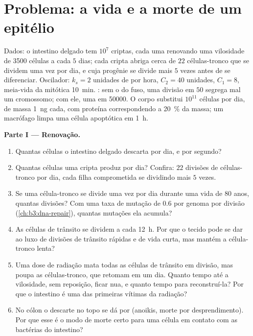 \section{Problema: a vida e a morte de um epitélio}

\begin{problem}
\label{pb:b3:cell-cycle-apoptosis:1}
Dados: o intestino delgado tem $10^{7}$ criptas, cada uma renovando uma
vilosidade de \num{3500} células a cada $5$ dias; cada cripta abriga
cerca de $22$ células-tronco que se dividem uma vez por dia, e cuja
progênie se divide mais $5$ vezes antes de se diferenciar. Oscilador:
$k_{s} = 2$ unidades de  por hora, $C_{2} = 40$ unidades,
$C_{1} = 8$, meia-vida da  mitótica \qty{10}{min}. : sem o  do fuso, uma divisão em $50$ segrega
mal um cromossomo; com ele, uma em \num{50000}. O corpo substitui
$10^{11}$ células por dia, de massa \qty{1}{ng} cada, com proteína
correspondendo a \qty{20}{\%} da massa; um macrófago limpa uma célula
apoptótica em \qty{1}{h}.

\medskip
\noindent\textbf{Parte I --- Renovação.}
\begin{enumerate}
  \item Quantas células o intestino delgado descarta por dia, e por
        segundo?
  \item Quantas células uma cripta produz por dia? Confira: $22$
        divisões de células-tronco por dia, cada filha comprometida se
        dividindo mais $5$ vezes.
  \item Se uma célula-tronco se divide uma vez por dia durante uma vida
        de $80$ anos, quantas divisões? Com uma taxa de mutação de
        $0.6$ por genoma por divisão (\cref{ch:b3:dna-repair}), quantas
        mutações ela acumula?
  \item As células de trânsito se dividem a cada \qty{12}{h}. Por que o
        tecido pode se dar ao luxo de divisões de trânsito rápidas e de
        vida curta, mas mantém a célula-tronco lenta?
  \item Uma dose de radiação mata todas as células de trânsito em
        divisão, mas poupa as células-tronco, que retomam em um dia.
        Quanto tempo até a vilosidade, sem reposição, ficar nua, e
        quanto tempo para reconstruí-la? Por que o intestino é uma das
        primeiras vítimas da radiação?
  \item No cólon o descarte no topo se dá por  (anoikis, morte
        por desprendimento). Por que esse é o modo de morte certo para
        uma célula em contato com as bactérias do intestino?
\end{enumerate}


\end{problem}
